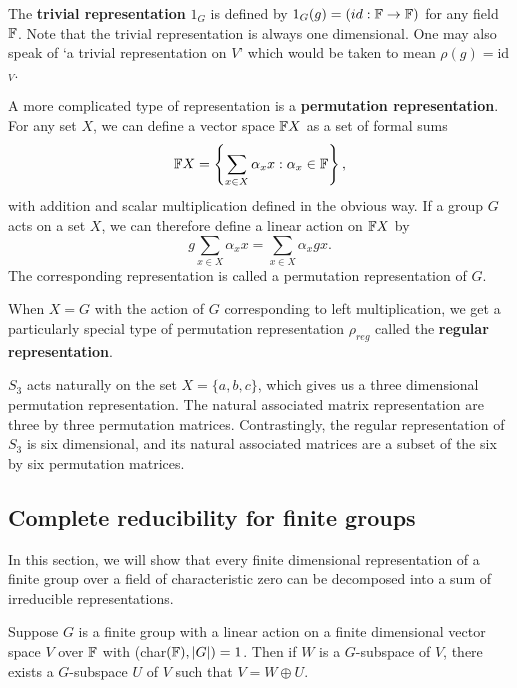 \documentclass[a4paper]{article}
\begin{document}
The \textbf{trivial representation} $1_G$ is defined by $1_G(g) = (id : \mathbb{F} \to \mathbb{F})$ for any field $\mathbb{F}$. Note that the trivial representation is always one dimensional. One may also speak of `a trivial representation on $V$' which would be taken to mean $\rho(g) = $id$_V$.

A more complicated type of representation is a \textbf{permutation representation}. For any set $X$, we can define a vector space $\mathbb{F} X$ as a set of formal sums $$\mathbb{F} X = \left\{ \sum_{x \in X} \alpha_x x : \alpha_x \in \mathbb{F} \right\},$$ with addition and scalar multiplication defined in the obvious way. 
If a group $G$ acts on a set $X$, we can therefore define a linear action on $\mathbb{F} X$ by $$g\sum_{x \in X} \alpha_x x = \sum_{x \in X} \alpha_x gx.$$ The corresponding representation is called a permutation representation of $G$.

When $X = G$ with the action of $G$ corresponding to left multiplication, we get a particularly special type of permutation representation $\rho_{reg}$ called the \textbf{regular representation}. 

\begin{eg}[Representations of $S_3$] 
    $S_3$ acts naturally on the set $X = \{a,b,c\}$, which gives us a three dimensional permutation representation. The natural associated matrix representation are three by three permutation matrices. Contrastingly, the regular representation of $S_3$ is six dimensional, and its natural associated matrices are a subset of the six by six permutation matrices.
\end{eg}

\subsection{Complete reducibility for finite groups}

In this section, we will show that every finite dimensional representation of a finite group over a field of characteristic zero can be decomposed into a sum of irreducible representations.

\begin{thm}
    Suppose $G$ is a finite group with a linear action on a finite dimensional vector space $V$ over $\mathbb{F}$ with (char$(\mathbb{F}), |G|) = 1$. Then if $W$ is a $G$-subspace of $V$, there exists a $G$-subspace $U$ of $V$ such that $V = W \oplus U$.
\end{thm}
\end{document}
